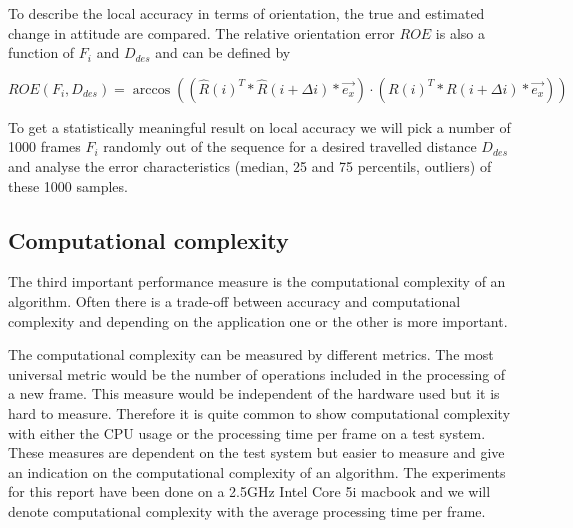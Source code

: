 To describe the local accuracy in terms of orientation, the true and estimated change in attitude are compared. The relative orientation error $ROE$ is also a function of $F_i$ and $D_{des}$ and can be defined by

\begin{equation}
ROE\left( F_i, D_{des} \right) = \arccos \left(\left( \hat{R} \left(i\right)^T * \hat{R} \left(i+\Delta i\right) * \vec{e_{x}} \right) \cdot \left( R \left(i\right)^T * R \left(i+\Delta i\right) * \vec{e_{x}} \right)\right)
\end{equation}

To get a statistically meaningful result on local accuracy we will pick a number of 1000 frames $F_i$ randomly out of the sequence for a desired travelled distance $D_{des}$ and analyse the error characteristics (median, 25 and 75 percentils, outliers) of these 1000 samples.




\subsection{Computational complexity}
\label{sec:complexity}

The third important performance measure is the computational complexity of an algorithm. Often there is a trade-off between accuracy and computational complexity and depending on the application one or the other is more important.

The computational complexity can be measured by different metrics. The most universal metric would be the number of operations included in the processing of a new frame. This measure would be independent of the hardware used but it is hard to measure. Therefore it is quite common to show computational complexity with either the CPU usage or the processing time per frame on a test system. These measures are dependent on the test system but easier to measure and give an indication on the computational complexity of an algorithm. The experiments for this report have been done on a 2.5GHz Intel Core 5i macbook and we will denote computational complexity with the average processing time per frame.











